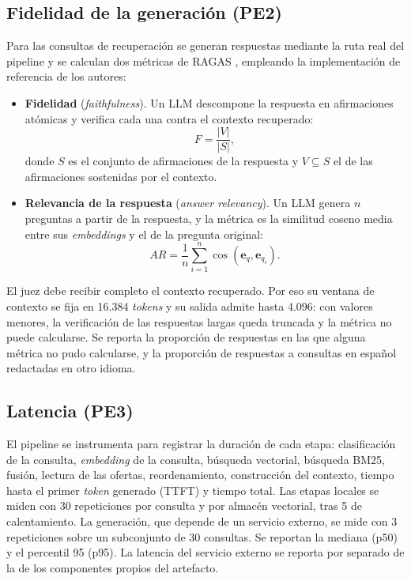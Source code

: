 \subsection{Fidelidad de la generación (PE2)}

Para las consultas de recuperación se generan respuestas mediante la ruta real del pipeline y se calculan dos métricas de RAGAS \citep{Es2024}, empleando la implementación de referencia de los autores:

\begin{itemize}
    \item \textbf{Fidelidad} (\textit{faithfulness}). Un LLM descompone la respuesta en afirmaciones atómicas y verifica cada una contra el contexto recuperado:
    \[
    F = \frac{|V|}{|S|},
    \]
    donde $S$ es el conjunto de afirmaciones de la respuesta y $V \subseteq S$ el de las afirmaciones sostenidas por el contexto.
    \item \textbf{Relevancia de la respuesta} (\textit{answer relevancy}). Un LLM genera $n$ preguntas a partir de la respuesta, y la métrica es la similitud coseno media entre sus \textit{embeddings} y el de la pregunta original:
    \[
    AR = \frac{1}{n}\sum_{i=1}^{n} \cos(\mathbf{e}_q, \mathbf{e}_{q_i}).
    \]
\end{itemize}

El juez debe recibir completo el contexto recuperado. Por eso su ventana de contexto se fija en 16.384 \textit{tokens} y su salida admite hasta 4.096: con valores menores, la verificación de las respuestas largas queda truncada y la métrica no puede calcularse. Se reporta la proporción de respuestas en las que alguna métrica no pudo calcularse, y la proporción de respuestas a consultas en español redactadas en otro idioma.

\subsection{Latencia (PE3)}

El pipeline se instrumenta para registrar la duración de cada etapa: clasificación de la consulta, \textit{embedding} de la consulta, búsqueda vectorial, búsqueda BM25, fusión, lectura de las ofertas, reordenamiento, construcción del contexto, tiempo hasta el primer \textit{token} generado (TTFT) y tiempo total. Las etapas locales se miden con 30 repeticiones por consulta y por almacén vectorial, tras 5 de calentamiento. La generación, que depende de un servicio externo, se mide con 3 repeticiones sobre un subconjunto de 30 consultas. Se reportan la mediana (p50) y el percentil 95 (p95). La latencia del servicio externo se reporta por separado de la de los componentes propios del artefacto.

